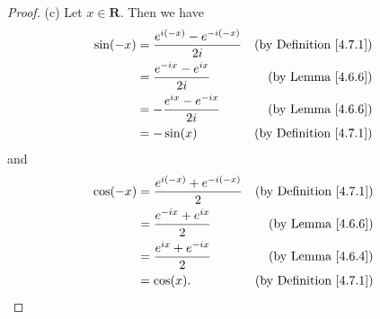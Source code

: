 \begin{proof}{(c)}
    Let \(x \in \mathbf{R}\).
    Then we have
    \begin{align*}
        \sin(-x) & = \frac{e^{i (-x)} - e^{- i (-x)}}{2i} & \text{(by Definition \ref{4.7.1})} \\
                 & = \frac{e^{- i x} - e^{i x}}{2i}       & \text{(by Lemma \ref{4.6.6})}      \\
                 & = -\frac{e^{i x} - e^{- i x}}{2i}      & \text{(by Lemma \ref{4.6.6})}      \\
                 & = -\sin(x)                             & \text{(by Definition \ref{4.7.1})}
    \end{align*}
    and
    \begin{align*}
        \cos(-x) & = \frac{e^{i (-x)} + e^{- i (-x)}}{2} & \text{(by Definition \ref{4.7.1})} \\
                 & = \frac{e^{- i x} + e^{i x}}{2}       & \text{(by Lemma \ref{4.6.6})}      \\
                 & = \frac{e^{i x} + e^{- i x}}{2}       & \text{(by Lemma \ref{4.6.4})}      \\
                 & = \cos(x).                            & \text{(by Definition \ref{4.7.1})}
    \end{align*}
\end{proof}

